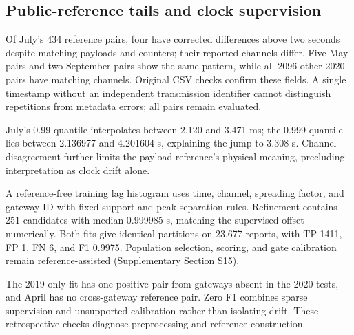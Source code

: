 \subsection{Public-reference tails and clock supervision}\label{sec:deep_loed}
Of July's 434 reference pairs, four have corrected differences above two seconds despite matching payloads and counters; their reported channels differ. Five May pairs and two September pairs show the same pattern, while all 2096 other 2020 pairs have matching channels. Original CSV checks confirm these fields. A single timestamp without an independent transmission identifier cannot distinguish repetitions from metadata errors; all pairs remain evaluated.

July's 0.99 quantile interpolates between 2.120 and 3.471 ms; the 0.999 quantile lies between 2.136977 and 4.201604 s, explaining the jump to 3.308 s. Channel disagreement further limits the payload reference's physical meaning, precluding interpretation as clock drift alone.

A reference-free training lag histogram uses time, channel, spreading factor, and gateway ID with fixed support and peak-separation rules. Refinement contains 251 candidates with median 0.999985 s, matching the supervised offset numerically. Both fits give identical partitions on 23,677 reports, with TP 1411, FP 1, FN 6, and F1 0.9975. Population selection, scoring, and gate calibration remain reference-assisted (Supplementary Section S15).

The 2019-only fit has one positive pair from gateways absent in the 2020 tests, and April has no cross-gateway reference pair. Zero F1 combines sparse supervision and unsupported calibration rather than isolating drift. These retrospective checks diagnose preprocessing and reference construction.
